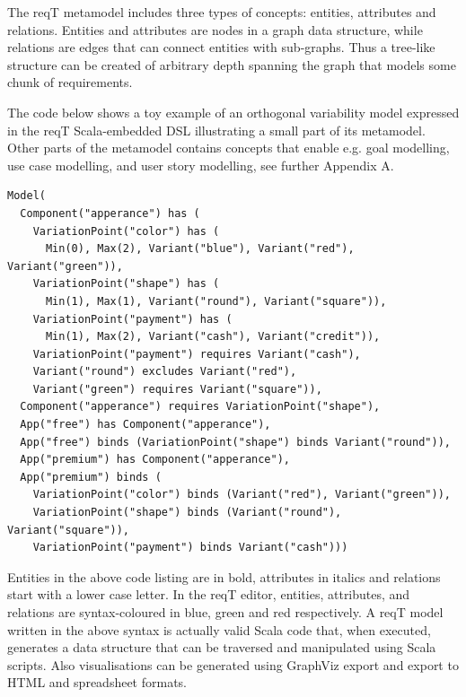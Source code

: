 \documentclass[a4paper]{llncs}
\begin{document}
The reqT metamodel includes three types of concepts: entities, attributes and relations. Entities and attributes are nodes in a graph data structure, while relations are edges that can connect entities with sub-graphs. Thus a tree-like structure can be created of arbitrary depth spanning the graph that models some chunk of requirements. 

The code below shows a toy example of an orthogonal variability model \cite{metzger2007variability} expressed in the reqT Scala-embedded DSL \cite{Regnell2013} illustrating a small part of its metamodel. Other parts of the metamodel contains concepts that enable e.g. goal modelling, %
use case modelling, and user story modelling, see further Appendix A.

\begin{spacing}{1.1}
\begin{lstlisting}
Model(
  Component("apperance") has (
    VariationPoint("color") has (
      Min(0), Max(2), Variant("blue"), Variant("red"), Variant("green")),
    VariationPoint("shape") has (
      Min(1), Max(1), Variant("round"), Variant("square")),
    VariationPoint("payment") has (
      Min(1), Max(2), Variant("cash"), Variant("credit")),
    VariationPoint("payment") requires Variant("cash"), 
    Variant("round") excludes Variant("red"),
    Variant("green") requires Variant("square")),
  Component("apperance") requires VariationPoint("shape"), 
  App("free") has Component("apperance"),  
  App("free") binds (VariationPoint("shape") binds Variant("round")),
  App("premium") has Component("apperance"),  
  App("premium") binds ( 
    VariationPoint("color") binds (Variant("red"), Variant("green")),
    VariationPoint("shape") binds (Variant("round"), Variant("square")),
    VariationPoint("payment") binds Variant("cash")))
\end{lstlisting}
\end{spacing}
\noindent Entities in the above code listing are in bold, attributes in italics and relations start with a lower case letter. In the reqT editor, entities, attributes, and relations are syntax-coloured in blue, green and red respectively. A reqT model written in the above syntax is actually valid Scala code that, when executed, generates a data structure that can be traversed and manipulated using Scala scripts. Also visualisations can be generated using GraphViz export and export to HTML and spreadsheet formats. 
\end{document}
